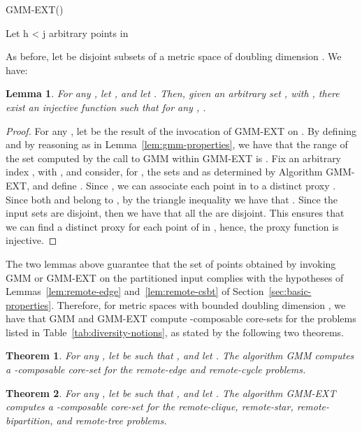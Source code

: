 \documentclass{article}
\newtheorem{theorem}{Theorem}
\newtheorem{lemma}{Lemma}
\newcommand{\Let}[2]{#1  #2} \SetKw{To}{to}
\begin{document}
\begin{algorithm}[t]
  \caption{{\sc GMM-EXT}()}
  \label{alg:GMM-EXT}
  \DontPrintSemicolon 
  \Let{}{}\;
  Let \;
  \Let{}{}\;
  \For{\Let{}{} \To } {
    \Let{}{h < j} \;
    \Let{}{   arbitrary  points in  }\;
    \Let{}{}\;
  }
  \Return{}\;
\end{algorithm}

As before, let  be disjoint subsets of a metric
space of doubling dimension . We have:
\begin{lemma}\label{lem:gmm-ext-properties}
  For any , let ,
  and let . Then, given an arbitrary set , with ,
  there exist an injective function  such that for
  any , .
\end{lemma}
\begin{proof}
  For any , let
   be the result of the
  invocation of {\sc GMM-EXT} on . By defining
   and by reasoning as in
  Lemma~\ref{lem:gmm-properties}, we have that the range of the set
   computed by the call to {\sc GMM} within {\sc
    GMM-EXT} is . Fix an
  arbitrary index , with , and consider, for
  , the sets  and  as determined by
  Algorithm {\sc GMM-EXT}, and define
  . Since
  , we can associate
  each point in  to a distinct proxy .
  Since both  and  belong to , by the triangle
  inequality we have that
  . Since the input sets
   are disjoint, then we have that all the
   are disjoint. This ensures that we can find a distinct
  proxy for each point of  in , hence,
  the proxy function is injective.
\end{proof}

The two lemmas above guarantee that the set of points obtained by
invoking {\sc GMM} or {\sc GMM-EXT} on the partitioned input complies
with the hypotheses of Lemmas~\ref{lem:remote-edge}
and~\ref{lem:remote-csbt} of
Section~\ref{sec:basic-properties}.  Therefore, for metric spaces with
bounded doubling dimension , we have that {\sc GMM} and {\sc
  GMM-EXT} compute -composable core-sets for the
problems listed in Table~\ref{tab:diversity-notions}, as stated by the
following two theorems.

\begin{theorem}\label{thm:mr-edge-cycle}
  For any , let  be such that
  , and let . The algorithm {\sc GMM} computes a -composable
  core-set for the remote-edge and remote-cycle problems.
\end{theorem}

\begin{theorem}\label{thm:mr-csbt}
  For any , let  be such that
  , and let
  . The algorithm {\sc
    GMM-EXT} computes a -composable core-set
  for the remote-clique, remote-star, remote-bipartition, and
  remote-tree problems.
\end{theorem}
\end{document}
